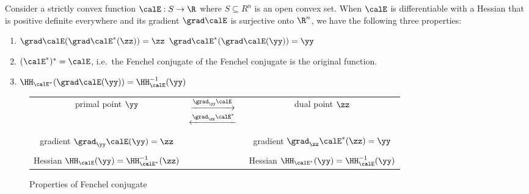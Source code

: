 \begin{theorem}
  \label{thm:conjugate}
  Consider a strictly convex function ${\calE : S \to \R}$ where $S \subseteq
  R^n$ is an open convex set. When $\calE$ is differentiable with a Hessian
  that is positive definite everywhere and its gradient $\grad \calE$
is surjective onto
  $\R^n$, we have the following three properties:
  \begin{enumerate}
  \item $\grad\calE(\grad\calE^*(\zz))=\zz$  $\grad\calE^*(\grad\calE(\yy)) = \yy$ \label{enu:gradmap}
  \item $(\calE^*)^* = \calE$, i.e.\ the Fenchel conjugate of the \label{enu:doubleconj}
      Fenchel conjugate is the original function.
  \item $\HH_{\calE^*}(\grad\calE(\yy)) = \HH_{\calE}^{-1}(\yy)$ \label{enu:hessianmap}
  \end{enumerate}
\end{theorem}

\begin{figure}[H]
\begin{mdframed}
  \centering
\begin{center}
\begin{tabular}{ c c c }
 primal point $\yy$
  & $  \begin{matrix}
    \xrightarrow{\grad_{\yy} \calE }{} \\
     \xleftarrow{\grad_{\zz} \calE^* }{}
   \end{matrix}$ &
                   dual point $\zz$ \\
  \\
 gradient $\grad_{\yy} \calE(\yy) = \zz$  & & gradient $\grad_{\zz}
                                              \calE^*(\zz) = \yy$ \\
  \\
 Hessian $\HH_{\calE}(\yy) = \HH_{\calE^*}^{-1}(\zz) $ & & Hessian $\HH_{\calE^*}(\yy) = \HH_{\calE}^{-1}(\yy)$
\end{tabular}
\end{center}
  \caption{Properties of Fenchel conjugate}
  \label{fig:fenchel}
\end{mdframed}
\end{figure}

